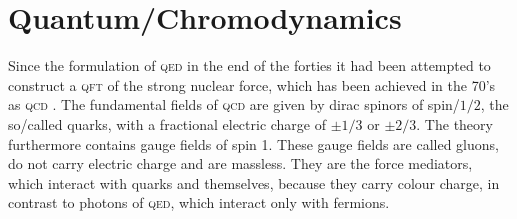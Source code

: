 \documentclass[../../index.tex]{subfiles}
\begin{document}
\section{Quantum\-/Chromodynamics}
\label{sec:quantumchromodynamics}
Since the formulation of \textsc{qed} in the end of the forties it had been
attempted to construct a \textsc{qft} of the strong nuclear force, which has
been achieved in the 70's as \textsc{qcd}
\cite{GellMann1972,Fritzsch1973,Gross1973,Politzer1973,Weinberg1973}.
The fundamental fields of \textsc{qcd} are given by dirac spinors of
spin\-/\(1/2\), the so\-/called quarks, with a fractional electric charge of
\(\pm 1/3\) or \(\pm 2/3\). The theory furthermore contains gauge fields of spin
1. These gauge fields are called gluons, do not carry electric charge and are
massless. They are the force mediators, which interact with quarks and
themselves, because they carry colour charge, in contrast to photons of
\textsc{qed}, which interact only with
fermions. %
\end{document}
